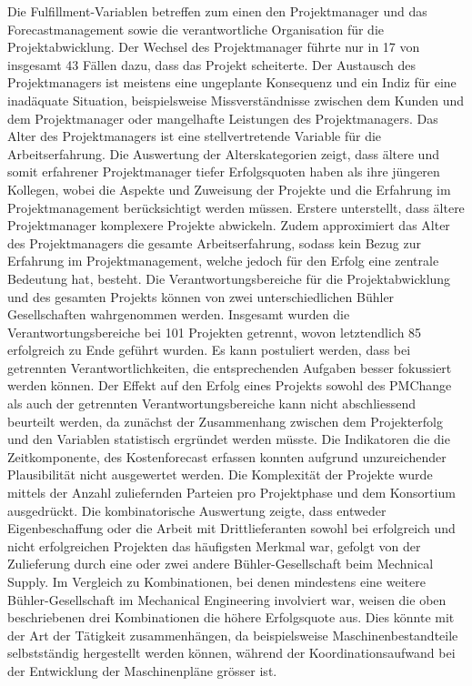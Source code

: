 Die Fulfillment-Variablen betreffen zum einen den Projektmanager und das Forecastmanagement sowie die verantwortliche Organisation für die Projektabwicklung. Der Wechsel des Projektmanager führte nur in 17 von insgesamt 43 Fällen dazu, dass das Projekt scheiterte. Der Austausch des Projektmanagers ist meistens eine ungeplante Konsequenz und ein Indiz für eine inadäquate Situation, beispielsweise Missverständnisse zwischen dem Kunden und dem Projektmanager oder mangelhafte Leistungen des Projektmanagers. Das Alter des Projektmanagers ist eine stellvertretende Variable für die Arbeitserfahrung. Die Auswertung der Alterskategorien zeigt, dass ältere und somit erfahrener Projektmanager tiefer Erfolgsquoten haben als ihre jüngeren Kollegen, wobei die Aspekte und Zuweisung der Projekte und die Erfahrung im Projektmanagement berücksichtigt werden müssen. Erstere unterstellt, dass ältere Projektmanager komplexere Projekte abwickeln. Zudem approximiert das Alter des Projektmanagers die gesamte Arbeitserfahrung, sodass kein Bezug zur Erfahrung im Projektmanagement, welche jedoch für den Erfolg eine zentrale Bedeutung hat, besteht. 
\newline Die Verantwortungsbereiche für die Projektabwicklung und des gesamten Projekts können von zwei unterschiedlichen Bühler Gesellschaften wahrgenommen werden. Insgesamt wurden die Verantwortungsbereiche bei 101 Projekten getrennt, wovon letztendlich 85 erfolgreich zu Ende geführt wurden. Es kann postuliert werden, dass bei getrennten Verantwortlichkeiten, die entsprechenden Aufgaben besser fokussiert werden können. 
\newline Der Effekt auf den Erfolg eines Projekts sowohl des PMChange als auch der getrennten Verantwortungsbereiche kann nicht abschliessend beurteilt werden, da zunächst der Zusammenhang zwischen dem Projekterfolg und den Variablen statistisch ergründet werden müsste. Die Indikatoren die die Zeitkomponente, des Kostenforecast erfassen konnten aufgrund unzureichender Plausibilität nicht ausgewertet werden. 
\newline\newline
Die Komplexität der Projekte wurde mittels der Anzahl zuliefernden Parteien pro Projektphase und dem Konsortium ausgedrückt. Die kombinatorische Auswertung zeigte, dass entweder Eigenbeschaffung oder die Arbeit mit Drittlieferanten sowohl bei erfolgreich und nicht erfolgreichen Projekten das häufigsten Merkmal war, gefolgt von der Zulieferung durch eine oder zwei andere Bühler-Gesellschaft beim Mechnical Supply. Im Vergleich zu Kombinationen, bei denen mindestens eine weitere Bühler-Gesellschaft im Mechanical Engineering involviert war, weisen die oben beschriebenen drei Kombinationen die höhere Erfolgsquote aus. Dies könnte mit der Art der Tätigkeit zusammenhängen, da beispielsweise Maschinenbestandteile selbstständig hergestellt werden können, während der Koordinationsaufwand bei der Entwicklung der Maschinenpläne grösser ist.

